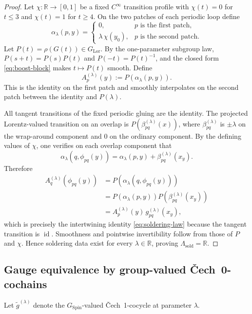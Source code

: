\documentclass[11pt,a4paper]{article}
\theoremstyle{definition}
\theoremstyle{remark}
\newcommand{\R}{\mathbb{R}}
\newcommand{\SpinG}{G_{\mathrm{Spin}}}
\newcommand{\LorG}{G_{\mathrm{Lor}}}
\newcommand{\id}{\operatorname{id}}
\newcommand{\Cech}{\ifmmode\text{\v{C}ech}\else\v{C}ech\fi}
\begin{document}
\begin{proof}
Let \(\chi:\R\to[0,1]\) be a fixed \(C^\infty\) transition profile with
\(\chi(t)=0\) for \(t\le3\) and \(\chi(t)=1\) for \(t\ge4\).  On the two
patches of each periodic loop define
\[
  \alpha_\lambda(p,y)=
  \begin{cases}
     0, & p\text{ is the first patch},\\
     \lambda\,\chi(y_0), & p\text{ is the second patch}.
  \end{cases}
\tag{11.6a}\label{eq:solder-angle}
\]
Let \(P(t)=\rho(G(t))\in\LorG\).  By the one-parameter subgroup law,
\(P(s+t)=P(s)P(t)\) and \(P(-t)=P(t)^{-1}\), and the closed form
\eqref{eq:boost-block} makes \(t\mapsto P(t)\) smooth.  Define
\[
   A_p^{(\lambda)}(y):=P(\alpha_\lambda(p,y)).
\tag{11.6b}\label{eq:explicit-solder}
\]
This is the identity on the first patch and smoothly interpolates on the
second patch between the identity and \(P(\lambda)\).

All tangent transitions of the fixed periodic gluing are the identity.
The projected Lorentz-valued transition on an overlap is
\(P(\beta_{pq}^{(\lambda)}(x))\), where
\(\beta_{pq}^{(\lambda)}\) is \(\pm\lambda\) on the wrap-around component
and \(0\) on the ordinary component.  By the defining values of \(\chi\),
one verifies on each overlap component that
\[
   \alpha_\lambda(q,\phi_{pq}(y))
   =\alpha_\lambda(p,y)+\beta_{pq}^{(\lambda)}(x_y).
\tag{11.6c}\label{eq:solder-angle-step}
\]
Therefore
\[
\begin{aligned}
  A_q^{(\lambda)}(\phi_{pq}(y))
   &=P(\alpha_\lambda(q,\phi_{pq}(y)))\\
   &=P(\alpha_\lambda(p,y))
     P(\beta_{pq}^{(\lambda)}(x_y))\\
   &=A_p^{(\lambda)}(y)\,g_{pq}^{(\lambda)}(x_y),
\end{aligned}
\]
which is precisely the intertwining identity \eqref{eq:soldering-law} because the tangent transition is
\(\id\).  Smoothness and pointwise invertibility follow from those of
\(P\) and \(\chi\).  Hence soldering data exist for every
\(\lambda\in\R\), proving \(\Lambda_{\mathrm{sold}}=\R\).
\end{proof}

\subsection{Gauge equivalence by group-valued \Cech\ 0-cochains}

Let \(\widetilde g^{(\lambda)}\) denote the \(\SpinG\)-valued \Cech\ 1-cocycle at
parameter \(\lambda\).
\end{document}

